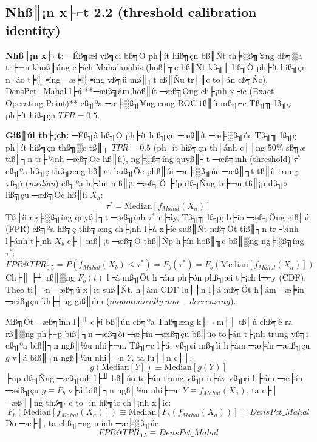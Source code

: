 ﻿\documentclass[../main.tex]{subfiles}
\begin{document}
\subsection{Nhß║¡n x├⌐t 2.2 (threshold calibration identity)}
\textbf{Nhß║¡n x├⌐t:} ─Éß╗æi vß╗¢i bß╗Ö ph├ít hiß╗çn bß║Ñt th╞░ß╗¥ng dß╗▒a tr├¬n khoß║úng c├ích Mahalanobis (hoß║╖c bß║Ñt kß╗│ bß╗Ö ph├ít hiß╗çn n├áo t╞░╞íng ─æ╞░╞íng vß╗ü mß║╖t cß║Ñu tr├║c to├án cß╗Ñc), DensPct\_Mahal l├á **─æiß╗âm hoß║ít ─æß╗Öng ch├¡nh x├íc (Exact Operating Point)** cß╗ºa ─æ╞░ß╗¥ng cong ROC tß║íi mß╗⌐c Tß╗╖ lß╗ç ph├ít hiß╗çn $TPR = 0.5$.

\textbf{Giß║úi th├¡ch:}
─Éß╗â bß╗Ö ph├ít hiß╗çn ─æß║ít ─æ╞░ß╗úc Tß╗╖ lß╗ç ph├ít hiß╗çn thß╗▒c tß║┐ $TPR = 0.5$ (ph├ít hiß╗çn th├ánh c├┤ng 50\% sß╗æ tiß║┐n tr├¼nh ─æß╗Öc hß║íi), ng╞░ß╗íng quyß║┐t ─æß╗ïnh (threshold) $\tau^*$ cß╗ºa hß╗ç thß╗æng bß║»t buß╗Öc phß║úi ─æ╞░ß╗úc ─æß║╖t tß║íi trung vß╗ï (\textit{median}) cß╗ºa h├ám mß║¡t ─æß╗Ö ├íp dß╗Ñng tr├¬n tß║¡p dß╗» liß╗çu ─æß╗Öc hß║íi $X_a$:
\begin{equation}
    \tau^* = \text{Median}[f_{Mahal}(X_a)]
\end{equation}
Tß║íi ng╞░ß╗íng quyß║┐t ─æß╗ïnh $\tau^*$ n├áy, Tß╗╖ lß╗ç b├ío ─æß╗Öng giß║ú (FPR) cß╗ºa hß╗ç thß╗æng ch├¡nh l├á x├íc suß║Ñt mß╗Öt tiß║┐n tr├¼nh l├ánh t├¡nh $X_b$ c├│ mß║¡t ─æß╗Ö thß║Ñp h╞ín hoß║╖c bß║▒ng ng╞░ß╗íng $\tau^*$:
\begin{equation}
    FPR@TPR_{0.5} = P(f_{Mahal}(X_b) \le \tau^*) = F_b(\tau^*) = F_b\left(\text{Median}[f_{Mahal}(X_a)]\right)
\end{equation}
Ch├║ ├╜ rß║▒ng $F_b(t)$ l├á mß╗Öt h├ám ph├ón phß╗æi t├¡ch l┼⌐y (CDF). Theo ti├¬n ─æß╗ü x├íc suß║Ñt, h├ám CDF lu├┤n l├á mß╗Öt h├ám ─æ╞ín ─æiß╗çu kh├┤ng giß║úm ($monotonically\ non-decreasing$). 

Mß╗Öt ─æß╗ïnh l├╜ c╞í bß║ún cß╗ºa Thß╗æng k├¬ m├┤ tß║ú chß╗ë ra rß║▒ng ph├⌐p biß║┐n ─æß╗òi ─æ╞ín ─æiß╗çu bß║úo to├án t├¡nh trung vß╗ï cß╗ºa biß║┐n ngß║½u nhi├¬n. Tß╗⌐c l├á, vß╗¢i mß╗ìi h├ám ─æ╞ín ─æiß╗çu $g$ v├á biß║┐n ngß║½u nhi├¬n $Y$, ta lu├┤n c├│:
\begin{equation}
    g(\text{Median}[Y]) \equiv \text{Median}[g(Y)]
\end{equation}
├üp dß╗Ñng ─æß╗ïnh l├╜ bß║úo to├án trung vß╗ï n├áy vß╗¢i h├ám ─æ╞ín ─æiß╗çu $g \equiv F_b$ v├á biß║┐n ngß║½u nhi├¬n $Y \equiv f_{Mahal}(X_a)$, ta c├│ ─æß║│ng thß╗⌐c to├ín hß╗ìc ch├¡nh x├íc:
\begin{equation}
    F_b\left(\text{Median}[f_{Mahal}(X_a)]\right) \equiv \text{Median}\left[ F_b(f_{Mahal}(X_a)) \right] = DensPct\_Mahal
\end{equation}
Do ─æ├│, ta chß╗⌐ng minh ─æ╞░ß╗úc:
\begin{equation}
    FPR@TPR_{0.5} \equiv DensPct\_Mahal
\end{equation}
\end{document}
